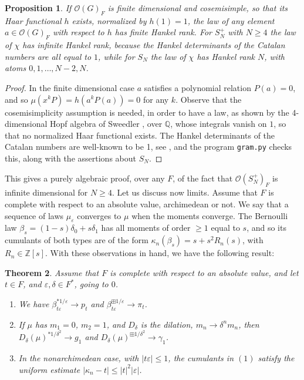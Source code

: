 \documentclass[11pt]{amsart}
\newtheorem{theorem}{Theorem}[section]
\newtheorem{proposition}[theorem]{Proposition}
\theoremstyle{definition}
\begin{document}
\begin{proposition}
\label{p64}
If $\mathcal O(G)_F$ is finite dimensional and cosemisimple, so that its Haar functional $h$ exists, normalized by $h(1)=1$, the law of any element $a\in\mathcal O(G)_F$ with respect to $h$ has finite Hankel rank. For $S_N^+$ with $N\geq4$ the law of $\chi$ has infinite Hankel rank, because the Hankel determinants of the Catalan numbers are all equal to $1$, while for $S_N$ the law of $\chi$ has Hankel rank $N$, with atoms $0,1,\ldots,N-2,N$.
\end{proposition}

\begin{proof}
In the finite dimensional case $a$ satisfies a polynomial relation $P(a)=0$, and so $\mu(x^kP)=h(a^kP(a))=0$ for any $k$. Observe that the cosemisimplicity assumption is needed, in order to have a law, as shown by the 4-dimensional Hopf algebra of Sweedler \cite{swe}, over $\mathbb Q$, whose integrals vanish on $1$, so that no normalized Haar functional exists. The Hankel determinants of the Catalan numbers are well-known to be 1, see \cite{aig}, and the program {\tt gram.py} checks this, along with the assertions about $S_N$.
\end{proof}

This gives a purely algebraic proof, over any $F$, of the fact that $\mathcal O(S_N^+)_F$ is infinite dimensional for $N\geq4$. Let us discuss now limits. Assume that $F$ is complete with respect to an absolute value, archimedean or not. We say that a sequence of laws $\mu_\varepsilon$ converges to $\mu$ when the moments converge. The Bernoulli law $\beta_s=(1-s)\delta_0+s\delta_1$ has all moments of order $\geq1$ equal to $s$, and so its cumulants of both types are of the form $\kappa_n(\beta_s)=s+s^2R_n(s)$, with $R_n\in\mathbb Z[s]$. With these observations in hand, we have the following result:

\begin{theorem}
\label{t65}
Assume that $F$ is complete with respect to an absolute value, and let $t\in F$, and $\varepsilon,\delta\in F^*$, going to $0$.
\begin{enumerate}
\item We have $\beta_{t\varepsilon}^{*1/\varepsilon}\to p_t$ and $\beta_{t\varepsilon}^{\boxplus1/\varepsilon}\to\pi_t$.

\item If $\mu$ has $m_1=0$, $m_2=1$, and $D_\delta$ is the dilation, $m_n\to\delta^nm_n$, then $D_\delta(\mu)^{*1/\delta^2}\to g_1$ and $D_\delta(\mu)^{\boxplus1/\delta^2}\to\gamma_1$.

\item In the nonarchimedean case, with $|t\varepsilon|\leq1$, the cumulants in $(1)$ satisfy the uniform estimate $|\kappa_n-t|\leq|t|^2|\varepsilon|$.
\end{enumerate}
\end{theorem}
\end{document}
